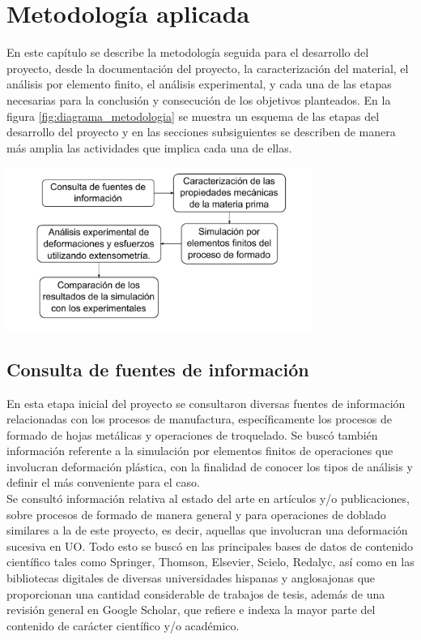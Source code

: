 \chapter{Metodología aplicada}

En este capítulo se describe la metodología seguida para el desarrollo del proyecto, 
desde la documentación del proyecto, la caracterización del material, el análisis por 
elemento finito, el análisis experimental, y cada una de las etapas necesarias para 
la conclusión y consecución de los objetivos planteados. En la figura \ref{fig:diagrama_metodologia} 
se muestra un esquema de las etapas del desarrollo del proyecto y en las secciones 
subsiguientes se describen de manera más amplia las actividades que implica cada una de ellas.

\begin{center}
\includegraphics[width=0.75\textwidth]{src/ch3/diagrama_metodologia.pdf}
\label{fig:diagrama_metodologia}
\end{center}

\section{Consulta de fuentes de información}

En esta etapa inicial del proyecto se consultaron diversas fuentes de información 
relacionadas con los procesos de manufactura, específicamente los procesos 
de formado de hojas metálicas y operaciones de troquelado. Se buscó también información 
referente a la simulación por elementos finitos de operaciones que involucran 
deformación plástica, con la finalidad de conocer los tipos de análisis y definir 
el más conveniente para el caso. \\

Se consultó información relativa al estado del arte en artículos y/o publicaciones, 
sobre procesos de formado de manera general y para operaciones de doblado similares a la 
de este proyecto, es decir, aquellas que involucran una deformación sucesiva en UO. 
Todo esto se buscó en las principales bases de datos de contenido científico tales 
como Springer, Thomson, Elsevier, Scielo, Redalyc, así como en las bibliotecas 
digitales de diversas universidades hispanas y anglosajonas que proporcionan una 
cantidad considerable de trabajos de tesis, además de una revisión general en 
Google Scholar, que refiere e indexa la mayor parte del contenido de carácter científico 
y/o académico.

